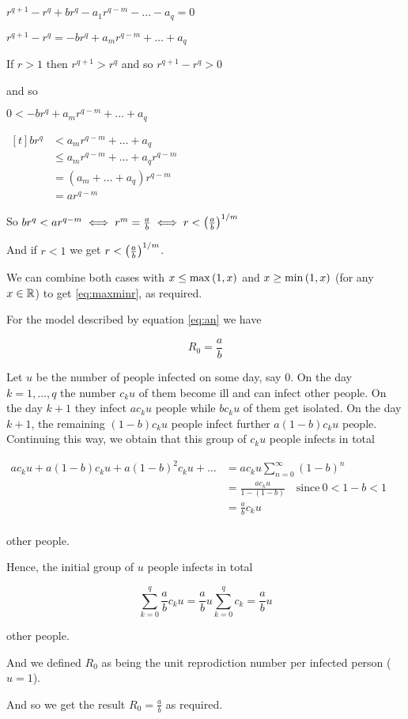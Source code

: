 \begin{theorem}
\begin{pf}
\begin{enumerate}[(a)]
    \imp $r^{q+1} - r^q + br^q - a_1r^{q-m} - \dots -  a_q=0$
    
    \imp $r^{q+1} - r^q =-br^q + a_mr^{q-m} + \dots  + a_q$
    
    If $r>1$ then $r^{q+1}>r^q$ and so $r^{q+1}-r^q>0$
    
    and so 
    
    $0<-br^q + a_mr^{q-m} +  \dots + a_q$
    
    \imp $\begin{aligned}[t]
    br^q 
    &<    a_mr^{q-m} +  \dots + a_q\\
    &\leq a_mr^{q-m} +  \dots + a_qr^{q-m} \\
    &= (a_m + \dots + a_q)r^{q-m} \\
    &= ar^{q-m} 
    \end{aligned}$
    
    So $br^q < ar^{q-m} \iff r^m=\frac{a}{b} \iff r<\left(\frac{a}{b}\right)^{1/m}$
    
    And if $r<1$ we get $r<\left(\frac{a}{b}\right)^{1/m}$.
    
    We can combine both cases with $x\leq \max\left(1,x\right)$ and $x\geq \min\left(1,x\right)$ (for any $x\in \mathbb R$) to get \ref{eq:maxminr}, as required.
\end{enumerate}
\end{pf}
\end{theorem}

\begin{lemma}
For the model described by equation \ref{eq:an} we have

$$R_0=\frac{a}{b}$$

\begin{pf}
Let $u$ be the number of people infected on some day, say $0$. On the day $k = 1, \dots , q$ the number $c_ku$ of them become ill and can infect other people. On the day $k + 1$ they infect $ac_ku$ people while $bc_ku$ of them get isolated. On the day $k + 1$, the remaining $(1 - b) c_ku$ people infect further $a (1 - b) c_ku$ people. Continuing this way, we obtain that this group of $c_ku$ people infects in total

$\begin{aligned}
ac_ku+a(1-b)c_ku+a(1-b)^2c_ku+\dots 
&= ac_ku\sum\limits_{n=0}^\infty (1-b)^n \\
&= \frac{ac_ku}{1-(1-b)} \quad \text{since} \ 0<1-b<1\\
&=\frac{a}{b}c_ku\\
\end{aligned}$ 

other people.

Hence, the initial group of $u$ people infects in total 

$$\sum\limits_{k=0}^q \frac{a}{b}c_ku 
= \frac{a}{b}u\sum\limits_{k=0}^q c_k
= \frac{a}{b}u$$

other people.

And we defined $R_0$ as being the unit reprodiction number per infected person ($u=1$).

And so we get the result $R_0=\frac{a}{b}$ as required.
\end{pf}
\end{lemma}


